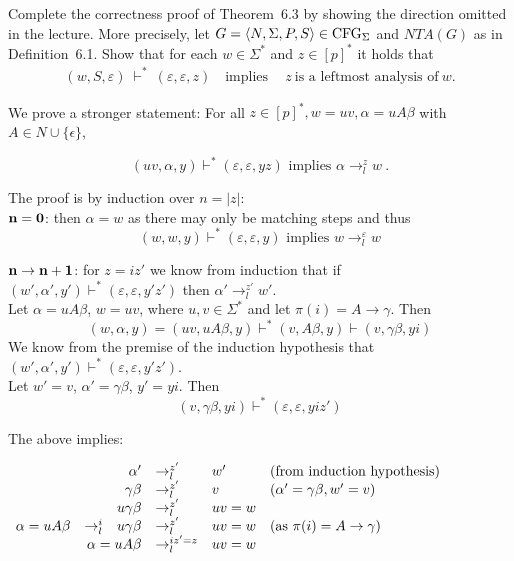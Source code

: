 \begin{exercise}{50}
      Complete the correctness proof of %
      Theorem~6.3 by showing the direction omitted in the lecture.
      More precisely, let $G = \langle N, \Sigma, P, S \rangle \in \textnormal{CFG}_{\Sigma}$ and $NTA(G)$ as in %
      Definition~6.1.
      Show that for each $w \in \Sigma^{*}$ and $z \in [p]^{*}$ it holds that
      \begin{align*}
         (w,S,\varepsilon) ~\vdash^{*}~ (\varepsilon,\varepsilon,z)  \quad\text{implies}~\quad z~\text{is a leftmost analysis of}~w.
      \end{align*}
\end{exercise}

\begin{solution}
We prove a stronger statement: For all $z \in [p]^*, w =uv, \alpha = uA\beta$ with $A \in N \cup \{\epsilon\}$,

$$(uv, \alpha, y) \vdash^* (\varepsilon, \varepsilon, yz) \text{ implies } \alpha \to_l^z w ~.$$

The proof is by induction over $n = |z|$:\\

$\bf{n=0}$: then $\alpha = w$ as there may only be matching steps and thus
$$(w, w, y) \vdash^* (\varepsilon, \varepsilon, y) \text{ implies } w \to_l^\varepsilon w$$

$\bf{n \to n+1}$: for $z = iz'$ we know from induction that if
	$(w', \alpha', y') \vdash^* (\varepsilon, \varepsilon, y'z')$
	then $\alpha' \to_l^{z'} w'$.\\

	Let $\alpha = uA\beta$, $w = uv$, where $u, v \in \Sigma^*$	and let $\pi(i) = A \to \gamma$.
    Then
    $$(w, \alpha, y) = (uv, uA\beta, y) \vdash^* (v, A\beta, y) \vdash (v, \gamma\beta, yi)$$
    We know from the premise of the induction hypothesis that $(w', \alpha', y') \vdash^* (\varepsilon, \varepsilon, y'z')$.\\
    Let $w'=v$, $\alpha'=\gamma\beta$, $y'=yi$.
    Then
    $$(v, \gamma\beta, yi) \vdash^* (\varepsilon, \varepsilon, yiz')$$

The above implies:
\begin{center}
$\begin{array}{rlrlll}
&& \alpha' &\to_l^{z'}& w' & \text{(from induction hypothesis)}\\
&& \gamma\beta &\to_l^{z'}& v & (\alpha'=\gamma\beta, w'=v) \\
&& u\gamma\beta &\to_l^{z'}& uv = w & \\
\alpha = uA\beta &\to^i_l& u\gamma\beta
 &\to_l^{z'}& uv = w & (\text{as }\pi(i) = A \to \gamma) \\
\multicolumn{3}{r}{\alpha = uA\beta} &\to_l^{iz'=z}& uv = w &
\end{array}$
\end{center}
\end{solution}

